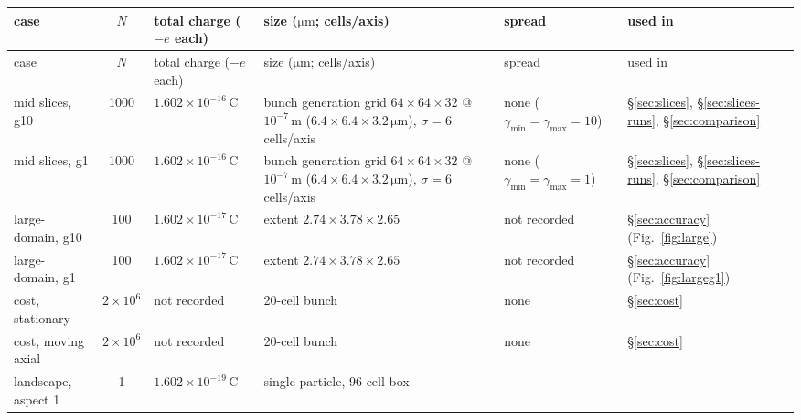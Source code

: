 \begin{table}[t]
\centering
\footnotesize
\setlength{\tabcolsep}{3pt}
\renewcommand{\arraystretch}{1.05}
\caption{Configurations of every measured case and the section that uses it
(recorded values of this work; ``not recorded'' means no value was recorded).
The two mid-slice entries give the bunch generation grid; the
field grid for those cases ($32\times32\times16$ @ $2\times10^{-7}$\,m) is in
the second block. Kinetic energy is $(\gamma-1)\,m_ec^2$; the multi-velocity
driver cell size is $10^{-6}$\,m. The divergence
$N=200$ subset exists but its independent reference is pending, so it is not
a row here.}
\label{tab:configs}
\begin{longtable}{@{}p{2.3cm}cp{2.5cm}p{2.9cm}p{2.9cm}p{2.9cm}@{}}
\toprule
case & $N$ & total charge ($-e$ each) & size ($\si{\micro\metre}$; cells/axis) & spread & used in \\
\midrule
\endfirsthead
\toprule
case & $N$ & total charge ($-e$ each) & size ($\si{\micro\metre}$; cells/axis) & spread & used in \\
\midrule
\endhead
\bottomrule
\endfoot
mid slices, g10 & 1000 & $1.602\times10^{-16}$\,C
  & bunch generation grid $64\times64\times32$ @ $10^{-7}$\,m ($6.4\times6.4\times3.2\,\si{\micro\metre}$), $\sigma\!=\!6$ cells/axis
  & none ($\gamma_{\min}\!=\!\gamma_{\max}\!=\!10$)
  & \S\ref{sec:slices}, \S\ref{sec:slices-runs}, \S\ref{sec:comparison} \\
mid slices, g1 & 1000 & $1.602\times10^{-16}$\,C
  & bunch generation grid $64\times64\times32$ @ $10^{-7}$\,m ($6.4\times6.4\times3.2\,\si{\micro\metre}$), $\sigma\!=\!6$ cells/axis
  & none ($\gamma_{\min}\!=\!\gamma_{\max}\!=\!1$)
  & \S\ref{sec:slices}, \S\ref{sec:slices-runs}, \S\ref{sec:comparison} \\
large-domain, g10 & 100 & $1.602\times10^{-17}$\,C
  & extent $2.74\times3.78\times2.65$
  & not recorded
  & \S\ref{sec:accuracy} (Fig.~\ref{fig:large}) \\
large-domain, g1 & 100 & $1.602\times10^{-17}$\,C
  & extent $2.74\times3.78\times2.65$
  & not recorded
  & \S\ref{sec:accuracy} (Fig.~\ref{fig:largeg1}) \\
cost, stationary & $2\times10^6$ & not recorded
  & 20-cell bunch
  & none
  & \S\ref{sec:cost} \\
cost, moving axial & $2\times10^6$ & not recorded
  & 20-cell bunch
  & none
  & \S\ref{sec:cost} \\
landscape, aspect 1 & 1 & $1.602\times10^{-19}$\,C
  & single particle, 96-cell box

\end{longtable}
\end{table}
